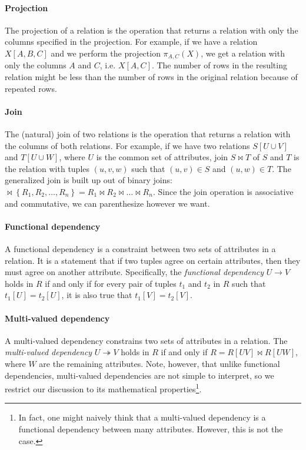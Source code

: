 \paragraph{Projection}  The projection of a relation is the operation that returns a
relation with only the columns specified in the projection.  For example, if we have a
relation $X[A, B, C]$ and we perform the projection $\pi_{A, C}(X)$, we get a
relation with only the columns $A$ and $C$, i.e. $X[A, C]$.  The number of rows
in the resulting relation might be less than the number of rows in the original relation
because of repeated rows.

\paragraph{Join}  The (natural) join of two relations is the operation that returns a
relation with the columns of both relations.  For example, if we have two relations $S[U
\cup V]$ and $T[U \cup W]$, where $U$ is the common set of attributes, join $S \bowtie T$
of $S$ and $T$ is the relation with tuples $(u, v, w)$ such that $(u, v) \in S$ and $(u,
w) \in T$.  The generalized join is built up out of binary joins:  $\bowtie \left\{ R_1,
R_2, \dots, R_n \right\} = R_1 \bowtie R_2 \bowtie \dots \bowtie R_n$. Since the join
operation is associative and commutative, we can parenthesize however we want.

\paragraph{Functional dependency}  A functional dependency is a constraint between two
sets of attributes in a relation.  It is a statement that if two tuples agree on certain
attributes, then they must agree on another attribute.  Specifically, the \emph{functional
dependency} $U \to V$ holds in $R$ if and only if for every pair of tuples $t_1$ and $t_2$
in $R$ such that $t_1[U] = t_2[U]$, it is also true that $t_1[V] = t_2[V]$.

\paragraph{Multi-valued dependency}  A multi-valued dependency constrains
two sets of attributes in a relation.  The
\emph{multi-valued dependency} $U \twoheadrightarrow V$ holds in $R$ if and only if $R =
R[UV] \bowtie R[UW]$, where $W$ are the remaining attributes.  Note, however, that unlike
functional dependencies, multi-valued dependencies are not simple to interpret, so we
restrict our discussion to its mathematical properties\footnote{In fact, one might
naively think that a multi-valued dependency is a functional dependency between
many attributes.  However, this is not the case.}.

